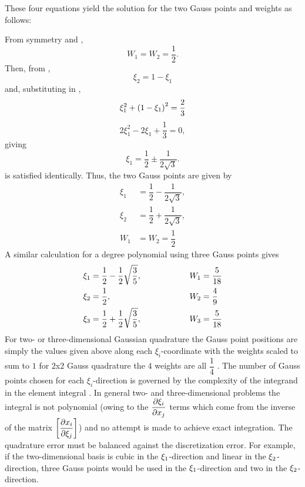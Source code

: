 These four equations yield the solution for the two Gauss points and weights
as follows: 

From symmetry and , 
\begin{equation*}
  W_{1} = W_{2} =  \dfrac{1}{2}. 
\end{equation*}
Then, from , 
\begin{equation*}
  \xi_{2}=1-\xi_{1}
\end{equation*}
and, substituting in ,
\begin{equation*}
  \xi_{1}^{2} + \left( 1- \xi_{1} \right)^{2} = \dfrac{2}{3}
\end{equation*}
\begin{equation*}
  2\xi_{1}^{2} - 2\xi_{1} + \dfrac{1}{3} = 0,
\end{equation*}  
giving  
\begin{equation*}
  \xi_{1} = \dfrac{1}{2} \pm \dfrac{1}{2\sqrt{3}} .
\end{equation*}
 is satisfied identically. Thus, the two Gauss points are 
given by 
\begin{equation}
\begin{split}
    \xi_{1} &= \dfrac12 - \dfrac{1}{2\sqrt{3}}, \\
    \xi_{2} &= \dfrac12 + \dfrac{1}{2\sqrt{3}}, \\
    W_{1} &= W_{2} = \dfrac12
  \label{eqn:2Gp}
\end{split}
\end{equation}
A similar calculation for a  degree polynomial using three Gauss points gives
\begin{alignat}{2}
  \xi_1 &= \dfrac12 - \dfrac12\sqrt{\dfrac35},&\qquad W_{1} &= \dfrac{5}{18}
  \notag \\ \xi_{2} &= \dfrac12, \;\; &\qquad\quad \qquad W_{2} &=
  \dfrac{4}{9} \\ \xi_{3} &= \dfrac12 + \dfrac12\sqrt{\dfrac{3}{5}},&\qquad
  W_{3} &= \dfrac{5}{18} \notag
  \label{eqn:3Gp}
\end{alignat}
For two- or three-dimensional Gaussian quadrature the Gauss point positions
are simply the values given above along each $\xi_{i}$-coordinate with the
weights scaled to sum to $1$ \eg for $2$x$2$ Gauss quadrature the $4$ weights
are all $\dfrac{1}{4}$ . The number of Gauss points chosen for each
$\xi_{i}$-direction is governed by the complexity of the integrand in the
element integral . In general two- and
three-dimensional problems the integral is not polynomial (owing to the
$ \dfrac{\partial \xi_{i}}{\partial x_{j}} $ terms which come from the inverse of the matrix
$\left[  \dfrac{\partial x_{i}}{\partial \xi_{j}}  \right]$) and no attempt is made to achieve exact
integration. The quadrature error must be balanced against the discretization
error. 
For example, if the two-dimensional basis is
cubic in the $\xi_{1}$-direction and linear in the $\xi_{2}$-direction, three
Gauss points would be used in the $\xi_{1}$-direction and two in the
$\xi_{2}$-direction. 

